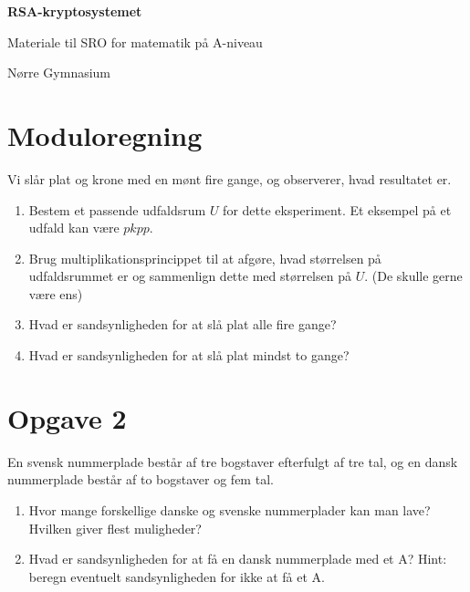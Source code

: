 \documentclass[12pt]{article}
\begin{document}
\begin{titlepage}
   \begin{center}
       \vspace*{1cm}

       \textbf{RSA-kryptosystemet}

       \vspace{0.5cm}
        Materiale til SRO for matematik på A-niveau
            
       \vspace{1.5cm}


       \vfill
            
      
            
       \vspace{0.8cm}
     
            
       Nørre Gymnasium\\
       \end{center}
\end{titlepage}
\tableofcontents
\begin{center}
\Huge

\end{center}

\section*{Moduloregning}


Vi slår plat og krone med en mønt fire gange, og observerer, hvad resultatet er.
\begin{enumerate}[label=\roman*)]
\item Bestem et passende udfaldsrum $U$ for dette eksperiment. Et eksempel på et udfald kan være $pkpp$.
\item Brug multiplikationsprincippet til at afgøre, hvad størrelsen på udfaldsrummet er og sammenlign dette med størrelsen på $U$. (De skulle gerne være ens)
\item Hvad er sandsynligheden for at slå plat alle fire gange?
\item Hvad er sandsynligheden for at slå plat mindst to gange?
\end{enumerate}
\section{Opgave 2}
En svensk nummerplade består af tre bogstaver efterfulgt af tre tal, og en dansk nummerplade består af to bogstaver og fem tal. 
\begin{enumerate}[label=\roman*)]
\item Hvor mange forskellige danske og svenske nummerplader kan man lave? Hvilken giver flest muligheder?
\item Hvad er sandsynligheden for at få en dansk nummerplade med et A? Hint: beregn eventuelt sandsynligheden for ikke at få et A.
\end{enumerate}
\end{document}
